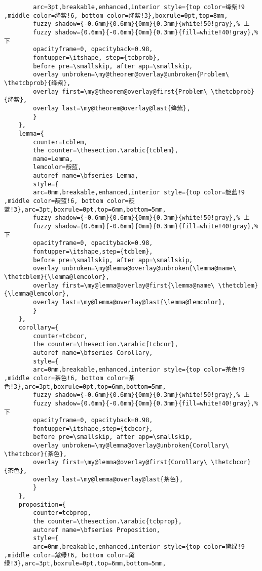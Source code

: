 \documentclass[lang=cn,zihao=-4,a4paper,fontset=windows]{beautybook}
\begin{document}
\begin{lstlisting}
        arc=3pt,breakable,enhanced,interior style={top color=绛紫!9 ,middle color=绛紫!6, bottom color=绛紫!3},boxrule=0pt,top=8mm,
        fuzzy shadow={-0.6mm}{0.6mm}{0mm}{0.3mm}{white!50!gray},% 上
        fuzzy shadow={0.6mm}{-0.6mm}{0mm}{0.3mm}{fill=white!40!gray},%下
        opacityframe=0, opacityback=0.98,
        fontupper=\itshape, step={tcbprob},
        before pre=\smallskip, after app=\smallskip,
        overlay unbroken=\my@theorem@overlay@unbroken{Problem\ \thetcbprob}{绛紫},
        overlay first=\my@theorem@overlay@first{Problem\ \thetcbprob}{绛紫},
        overlay last=\my@theorem@overlay@last{绛紫},
        }
    },
    lemma={
        counter=tcblem,
        the counter=\thesection.\arabic{tcblem},
        name=Lemma, 
        lemcolor=靛蓝, 
        autoref name=\bfseries Lemma,
        style={
        arc=0mm,breakable,enhanced,interior style={top color=靛蓝!9 ,middle color=靛蓝!6, bottom color=靛蓝!3},arc=3pt,boxrule=0pt,top=6mm,bottom=5mm,
        fuzzy shadow={-0.6mm}{0.6mm}{0mm}{0.3mm}{white!50!gray},% 上
        fuzzy shadow={0.6mm}{-0.6mm}{0mm}{0.3mm}{fill=white!40!gray},%下
        opacityframe=0, opacityback=0.98,
        fontupper=\itshape,step={tcblem},
        before pre=\smallskip, after app=\smallskip,
        overlay unbroken=\my@lemma@overlay@unbroken{\lemma@name\ \thetcblem}{\lemma@lemcolor},
        overlay first=\my@lemma@overlay@first{\lemma@name\ \thetcblem}{\lemma@lemcolor},
        overlay last=\my@lemma@overlay@last{\lemma@lemcolor},
        }
    },
    corollary={
        counter=tcbcor,
        the counter=\thesection.\arabic{tcbcor},
        autoref name=\bfseries Corollary,
        style={
        arc=0mm,breakable,enhanced,interior style={top color=茶色!9 ,middle color=茶色!6, bottom color=茶色!3},arc=3pt,boxrule=0pt,top=6mm,bottom=5mm,
        fuzzy shadow={-0.6mm}{0.6mm}{0mm}{0.3mm}{white!50!gray},% 上
        fuzzy shadow={0.6mm}{-0.6mm}{0mm}{0.3mm}{fill=white!40!gray},%下
        opacityframe=0, opacityback=0.98,
        fontupper=\itshape,step={tcbcor},
        before pre=\smallskip, after app=\smallskip,
        overlay unbroken=\my@lemma@overlay@unbroken{Corollary\ \thetcbcor}{茶色},
        overlay first=\my@lemma@overlay@first{Corollary\ \thetcbcor}{茶色},
        overlay last=\my@lemma@overlay@last{茶色},
        }
    },
    proposition={
        counter=tcbprop,
        the counter=\thesection.\arabic{tcbprop},
        autoref name=\bfseries Proposition,
        style={
        arc=0mm,breakable,enhanced,interior style={top color=黛绿!9 ,middle color=黛绿!6, bottom color=黛绿!3},arc=3pt,boxrule=0pt,top=6mm,bottom=5mm,

\end{lstlisting}
\end{document}
